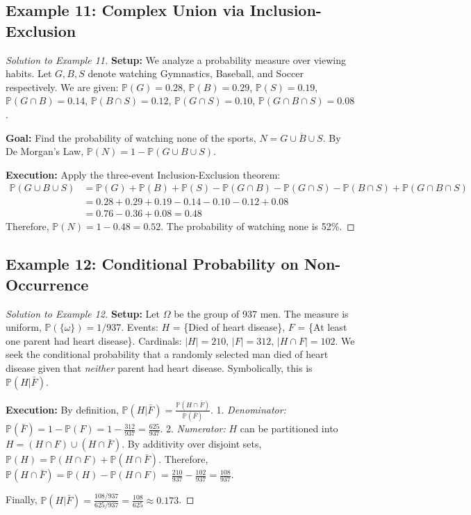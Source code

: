 \documentclass[12pt, a4paper]{article}
\theoremstyle{definition}
\theoremstyle{remark}
\newcommand{\Prob}{\mathbb{P}}
\newcommand{\W}{\Omega}
\newcommand{\1}{\mathbf{1}}
\begin{document}
\subsection*{Example 11: Complex Union via Inclusion-Exclusion}
\begin{proof}[Solution to Example 11]
\textbf{Setup:} We analyze a probability measure over viewing habits. Let $G, B, S$ denote watching Gymnastics, Baseball, and Soccer respectively. We are given:
$\Prob(G) = 0.28$, $\Prob(B) = 0.29$, $\Prob(S) = 0.19$, 
$\Prob(G \cap B) = 0.14$, $\Prob(B \cap S) = 0.12$, $\Prob(G \cap S) = 0.10$, $\Prob(G \cap B \cap S) = 0.08$.

\textbf{Goal:} Find the probability of watching none of the sports, $N = \overline{G \cup B \cup S}$. By De Morgan's Law, $\Prob(N) = 1 - \Prob(G \cup B \cup S)$.

\textbf{Execution:}
Apply the three-event Inclusion-Exclusion theorem:
\begin{align*}
\Prob(G \cup B \cup S) &= \Prob(G) + \Prob(B) + \Prob(S) - \Prob(G \cap B) - \Prob(G \cap S) - \Prob(B \cap S) + \Prob(G \cap B \cap S) \\
&= 0.28 + 0.29 + 0.19 - 0.14 - 0.10 - 0.12 + 0.08 \\
&= 0.76 - 0.36 + 0.08 = 0.48
\end{align*}
Therefore, $\Prob(N) = 1 - 0.48 = 0.52$. The probability of watching none is 52\%.
\end{proof}

\subsection*{Example 12: Conditional Probability on Non-Occurrence}
\begin{proof}[Solution to Example 12]
\textbf{Setup:} Let $\W$ be the group of 937 men. The measure is uniform, $\Prob(\{\omega\}) = 1/937$. 
Events: $H$ = \{Died of heart disease\}, $F$ = \{At least one parent had heart disease\}.
Cardinals: $|H| = 210$, $|F| = 312$, $|H \cap F| = 102$.
We seek the conditional probability that a randomly selected man died of heart disease given that \textit{neither} parent had heart disease. Symbolically, this is $\Prob(H | \bar{F})$.

\textbf{Execution:}
By definition, $\Prob(H | \bar{F}) = \frac{\Prob(H \cap \bar{F})}{\Prob(\bar{F})}$.
1. \textit{Denominator:} $\Prob(\bar{F}) = 1 - \Prob(F) = 1 - \frac{312}{937} = \frac{625}{937}$.
2. \textit{Numerator:} $H$ can be partitioned into $H = (H \cap F) \cup (H \cap \bar{F})$. 
By additivity over disjoint sets, $\Prob(H) = \Prob(H \cap F) + \Prob(H \cap \bar{F})$.
Therefore, $\Prob(H \cap \bar{F}) = \Prob(H) - \Prob(H \cap F) = \frac{210}{937} - \frac{102}{937} = \frac{108}{937}$.

Finally, $\Prob(H | \bar{F}) = \frac{108/937}{625/937} = \frac{108}{625} \approx 0.173$.
\end{proof}
\end{document}
